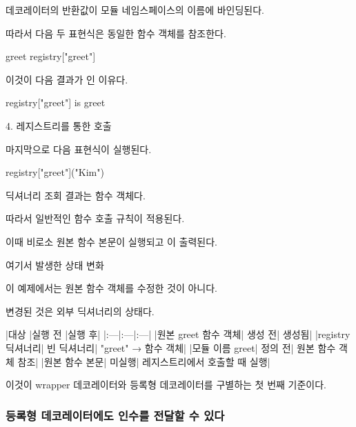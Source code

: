 데코레이터의 반환값이 모듈 네임스페이스의  이름에 바인딩된다.

따라서 다음 두 표현식은 동일한 함수 객체를 참조한다.

\begin{dhkcode}
greet
registry["greet"]
\end{dhkcode}

이것이 다음 결과가 인 이유다.

\begin{dhkcode}
registry["greet"] is greet
\end{dhkcode}

\begin{dhknote}
\begin{dhksmry}[centered]
4. 레지스트리를 통한 호출
\end{dhksmry}
\end{dhknote}

마지막으로 다음 표현식이 실행된다.

\begin{dhkcode}
registry["greet"]("Kim")
\end{dhkcode}

딕셔너리 조회 결과는 함수 객체다.

따라서 일반적인 함수 호출 규칙이 적용된다.

이때 비로소 원본 함수 본문이 실행되고 이 출력된다.

\begin{dhknote}
\begin{dhksmry}[centered]
여기서 발생한 상태 변화
\end{dhksmry}
\end{dhknote}

이 예제에서는 원본 함수 객체를 수정한 것이 아니다.

변경된 것은 외부 딕셔너리의 상태다.

\begin{dhktable}
|대상	|실행 전	|실행 후|
|:---|:---|:---|
|원본 greet 함수 객체|	생성 전|	생성됨|
|registry 딕셔너리|	빈 딕셔너리|	"greet" → 함수 객체|
|모듈 이름 greet|	정의 전|	원본 함수 객체 참조|
|원본 함수 본문|	미실행|	레지스트리에서 호출할 때 실행|
\end{dhktable}

이것이 wrapper 데코레이터와 등록형 데코레이터를 구별하는 첫 번째 기준이다.

\subsubsection{등록형 데코레이터에도 인수를 전달할 수 있다}

